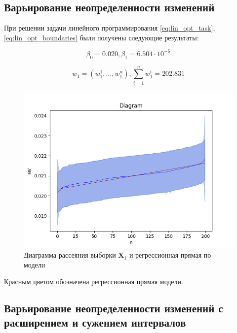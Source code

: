 \FloatBarrier

\subsection{Варьирование неопределенности изменений}

При решении задачи линейного программирования \eqref{eq:lin_opt_task}, \eqref{eq:lin_opt_boundaries} были получены следующие результаты: 

\begin{equation*}
	\beta_0 = 0.020, \beta_1 = 6.504 \cdot 10 ^ {-6} 
\end{equation*}

\begin{equation*}
	w_1 = (w^{1}_1, \ldots, w^{n}_1), \sum\limits_{i=1}^{n} w^{i}_1 = 202.831
\end{equation*}

\begin{figure}[ht]
	\begin{center}
		\includegraphics[scale = 0.55]{../images/diagram_and_regress_1.png}
	\end{center}
	\caption{Диаграмма рассеяния выборки $\bm{X}_1$ и регрессионная прямая по модели}
\end{figure}

Красным цветом обозначена регрессионная прямая модели. 

\FloatBarrier

\subsection{Варьирование неопределенности изменений с расширением и сужением интервалов}

